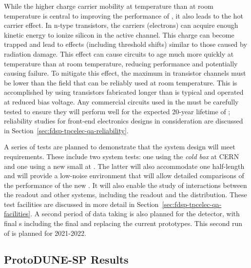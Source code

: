 While the higher charge carrier mobility at  temperature than at room temperature is central to improving the performance of , it also leads to the hot carrier effect. In n-type  transistors, the carriers (electrons) can acquire enough kinetic energy to ionize silicon in the active channel. This charge can become trapped and lead to effects (including threshold shifts) similar to those caused by radiation damage. This effect can cause  circuits to age much more quickly at  temperature than at room temperature, reducing performance and potentially causing failure. To mitigate this effect, the maximum \efield in transistor channels must be lower than the field that can be reliably used at room temperature. This is accomplished by using transistors fabricated longer than is typical and operated at reduced bias voltage. Any commercial circuits used in the  must be carefully tested to ensure they will perform well for the expected \num{20}-year lifetime of ; reliability studies for front-end electronics designs in consideration are discussed in Section~\ref{sec:fdsp-tpcelec-qa-reliability}.

A series of tests are planned to demonstrate that the  system design will meet  requirements. These include two system tests: one using the  \textit{cold box} at CERN and one using a new small  at \fnal. The latter will also accommodate one half-length   and will provide a low-noise environment that will allow detailed comparisons of the performance of the new . It will also enable the study of interactions between the  readout and other systems, including the  readout and the  distribution. These test facilities are discussed in more detail in Section~\ref{sec:fdsp-tpcelec-qa-facilities}. A second period of data taking is also planned for the  detector, with final s including the final  and  replacing the current prototypes. This second run of  is planned for 2021-2022.


\subsection{ProtoDUNE-SP Results}
\label{sec:fdsp-tpcelec-overview-pdune}

